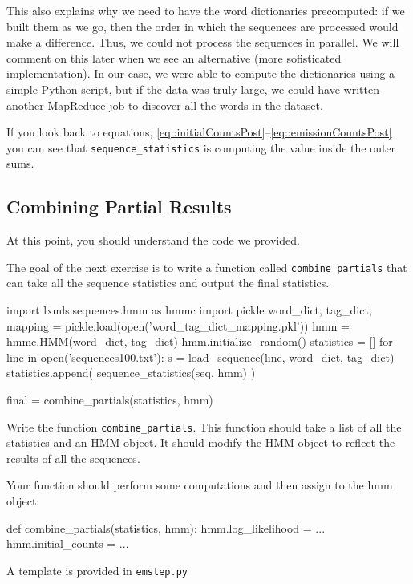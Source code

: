 This also explains why we need to have the word dictionaries precomputed: if we
built them as we go, then the order in which the sequences are processed would
make a difference. Thus, we could not process the sequences in parallel. We
will comment on this later when we see an alternative (more sofisticated
implementation). In our case, we were able to compute the dictionaries using a
simple Python script, but if the data was truly large, we could have written
another MapReduce job to discover all the words in the dataset.

If you look back to equations,
\eqref{eq::initialCountsPost}--\eqref{eq::emissionCountsPost} you can see that
\verb+sequence_statistics+ is computing the value inside the outer sums.

\subsection{Combining Partial Results}
At this point, you should understand the code we provided.

The goal of the next exercise is to write a function called \verb+combine_partials+
that can take all the sequence statistics and output the final statistics.

\begin{python}
import lxmls.sequences.hmm as hmmc
import pickle
word_dict, tag_dict, mapping = pickle.load(open('word_tag_dict_mapping.pkl'))
hmm = hmmc.HMM(word_dict, tag_dict)
hmm.initialize_random()
statistics = []
for line in open('sequences100.txt'):
    s = load_sequence(line, word_dict, tag_dict)
    statistics.append(
        sequence_statistics(seq, hmm)
        )

final = combine_partials(statistics, hmm)
\end{python}

\begin{exercise}
Write the function \verb+combine_partials+. This function should take a list of all
the statistics and an HMM object. It should modify the HMM object to reflect
the results of all the sequences.

Your function should perform some computations and then assign to the hmm object:

\begin{python}
def combine_partials(statistics, hmm):
    hmm.log_likelihood = ...
    hmm.initial_counts = ...
\end{python}

A template is provided in \verb+emstep.py+
\end{exercise}

